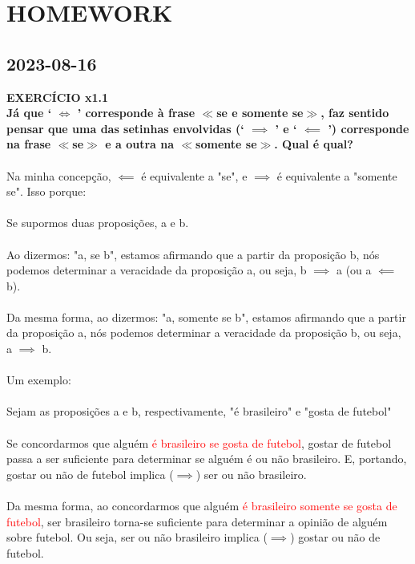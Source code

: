 \documentclass[a4paper, 12pt]{article}
\begin{document}
\section{HOMEWORK}
\subsection{2023-08-16}
\textbf{EXERCÍCIO x1.1 \\
Já que ‘ $\iff$ ’ corresponde à frase $\ll$se e somente se$\gg$, faz sentido pensar que uma das setinhas envolvidas (‘ $\implies$ ’ e ‘ $\impliedby$ ’) corresponde na frase $\ll$se$\gg$ e a outra na $\ll$somente se$\gg$. Qual é qual?} \\ \\
Na minha concepção, $\impliedby$ é equivalente a "se", e $\implies$ é equivalente a "somente se". Isso porque: \\ \\
Se supormos duas proposições, a e b. \\ \\
Ao dizermos: "a, se b", estamos afirmando que a partir da proposição b, nós podemos determinar a veracidade da proposição a, ou seja, b $\implies$ a (ou a $\impliedby$ b). \\ \\
Da mesma forma, ao dizermos: "a, somente se b", estamos afirmando que a partir da proposição a, nós podemos determinar a veracidade da proposição b, ou seja, a $\implies$ b. \\ \\
Um exemplo: \\ \\
Sejam as proposições a e b, respectivamente, "é brasileiro" e "gosta de futebol" \\ \\
Se concordarmos que alguém \textcolor{red}{é brasileiro se gosta de futebol}, gostar de futebol passa a ser suficiente para determinar se alguém é ou não brasileiro. E, portando, gostar ou não de futebol implica ($\implies$) ser ou não brasileiro. \\ \\
Da mesma forma, ao concordarmos que alguém \textcolor{red}{é brasileiro somente se gosta de futebol}, ser brasileiro torna-se suficiente para determinar a opinião de alguém sobre futebol. Ou seja, ser ou não brasileiro implica ($\implies$) gostar ou não de futebol. \\ \\
\end{document}
